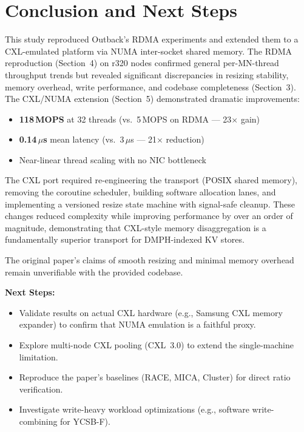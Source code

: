 \documentclass[conference]{IEEEtran}
\begin{document}
\section{Conclusion and Next Steps}

This study reproduced Outback's RDMA experiments and extended them to a CXL-emulated platform via NUMA inter-socket shared memory. The RDMA reproduction (Section~4) on r320 nodes confirmed general per-MN-thread throughput trends but revealed significant discrepancies in resizing stability, memory overhead, write performance, and codebase completeness (Section~3). The CXL/NUMA extension (Section~5) demonstrated dramatic improvements:

\begin{itemize}[nosep]
  \item \textbf{118\,MOPS} at 32 threads (vs.\ 5\,MOPS on RDMA --- 23$\times$ gain)
  \item \textbf{0.14\,$\mu$s} mean latency (vs.\ 3\,$\mu$s --- 21$\times$ reduction)
  \item Near-linear thread scaling with no NIC bottleneck
\end{itemize}

The CXL port required re-engineering the transport (POSIX shared memory), removing the coroutine scheduler, building software allocation lanes, and implementing a versioned resize state machine with signal-safe cleanup. These changes reduced complexity while improving performance by over an order of magnitude, demonstrating that CXL-style memory disaggregation is a fundamentally superior transport for DMPH-indexed KV stores.

The original paper's claims of smooth resizing and minimal memory overhead remain unverifiable with the provided codebase. 

\textbf{Next Steps:}
\begin{itemize}[nosep]
  \item Validate results on actual CXL hardware (e.g., Samsung CXL memory expander) to confirm that NUMA emulation is a faithful proxy.
  \item Explore multi-node CXL pooling (CXL~3.0) to extend the single-machine limitation.
  \item Reproduce the paper's baselines (RACE, MICA, Cluster) for direct ratio verification.
  \item Investigate write-heavy workload optimizations (e.g., software write-combining for YCSB-F).
\end{itemize}
\end{document}
